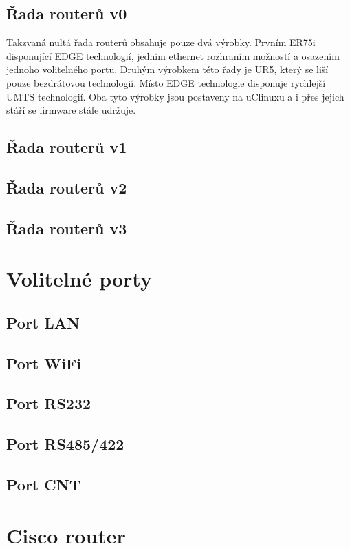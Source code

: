 \subsection{Řada routerů v0}
Takzvaná nultá řada routerů obsahuje pouze dvá výrobky. Prvním ER75i disponující EDGE technologií, jedním ethernet rozhraním možností a osazením jednoho volitelného portu.  Druhým výrobkem této řady je UR5, který se liší pouze bezdrátovou technologií. Místo EDGE technologie disponuje rychlejší UMTS technologií. Oba tyto výrobky jsou postaveny na uClinuxu a i přes jejich stáří se firmware stále udržuje.

\subsection{Řada routerů v1}


\subsection{Řada routerů v2}
\subsection{Řada routerů v3}

\section{Volitelné porty}
\subsection{Port LAN}
\subsection{Port WiFi}
\subsection{Port RS232}
\subsection{Port RS485/422}
\subsection{Port CNT}

\section{Cisco router}




\endinput
